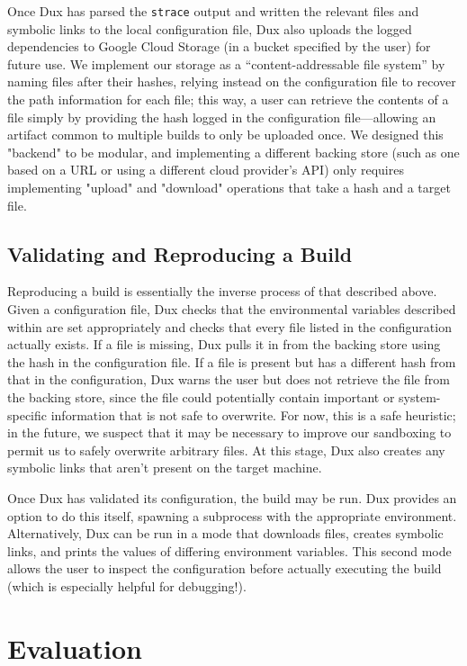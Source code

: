 \documentclass[10pt,conference]{IEEEtran}
\begin{document}
Once Dux has parsed the \texttt{strace} output and written the relevant files and symbolic links to
the local configuration file, Dux also uploads the logged dependencies to Google Cloud Storage (in a
bucket specified by the user) for future use. We implement our storage as a ``content-addressable
file system'' by naming files after their hashes, relying instead on the configuration file to recover
the path information for each file; this way, a user can retrieve the contents of a file simply by 
providing the hash logged in the configuration file---allowing an artifact common to multiple builds to
only be uploaded once. We designed this "backend" to be modular, and implementing a different backing store
(such as one based on a URL or using a different cloud provider's API) only requires implementing
"upload" and "download" operations that take a hash and a target file.

\subsection{Validating and Reproducing a Build}
Reproducing a build is essentially the inverse process of that described above. Given a configuration file,
Dux checks that the environmental variables described within are set appropriately and checks that every
file listed in the configuration actually exists. If a file is missing, Dux pulls it in from the backing store
using the hash in the configuration file. If a file is present but has a different hash from that
in the configuration, Dux warns the user but does not retrieve the file from the backing store, since the file
could potentially contain important or system-specific information that is not safe to overwrite. For now,
this is a safe heuristic; in the future, we suspect that it may be necessary to improve our sandboxing to permit
us to safely overwrite arbitrary files. At this stage, Dux also creates any symbolic links that aren't present
on the target machine.

Once Dux has validated its configuration, the build may be run. Dux provides an option to do this itself, spawning
a subprocess with the appropriate environment. Alternatively, Dux can be run in a mode that downloads files,
creates symbolic links, and prints the values of differing environment variables. This second mode allows the user
to inspect the configuration before actually executing the build (which is especially helpful for debugging!).

\section{Evaluation}
\end{document}
